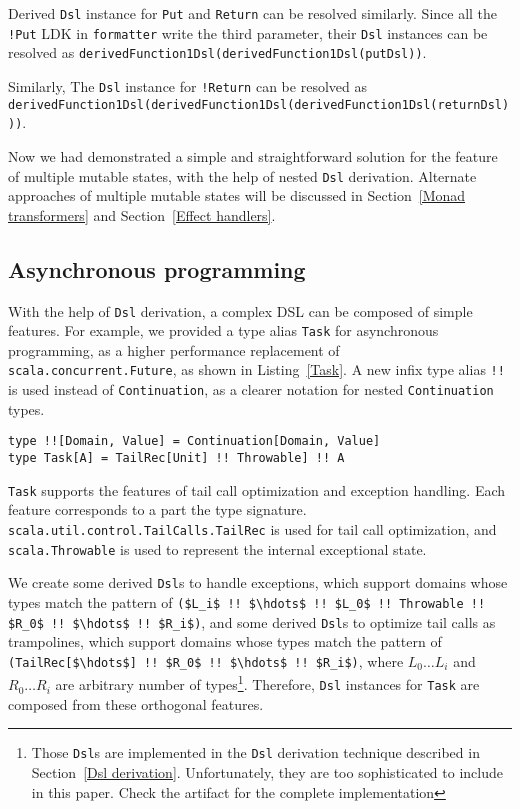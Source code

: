 Derived \lstinline{Dsl} instance for \lstinline{Put} and \lstinline{Return} can be resolved similarly. Since all the \lstinline{!Put} LDK in \lstinline{formatter} write the third parameter, their \lstinline{Dsl} instances can be resolved as \lstinline{derivedFunction1Dsl(derivedFunction1Dsl(putDsl))}.

Similarly, The \lstinline{Dsl} instance for \lstinline{!Return} can be resolved as \lstinline{derivedFunction1Dsl(derivedFunction1Dsl(derivedFunction1Dsl(returnDsl)))}.

Now we had demonstrated a simple and straightforward solution for the feature of multiple mutable states, with the help of nested \lstinline{Dsl} derivation. Alternate approaches of multiple mutable states will be discussed in Section~\ref{Monad transformers} and Section~\ref{Effect handlers}.


\subsection{Asynchronous programming}\label{Asynchronous programming}

With the help of \lstinline{Dsl} derivation, a complex DSL can be composed of simple features. For example, we provided a type alias \lstinline{Task} for asynchronous programming, as a higher performance replacement of \lstinline{scala.concurrent.Future}, as shown in Listing~\ref{Task}. A new infix type alias \lstinline{!!} is used instead of \lstinline{Continuation}, as a clearer notation for nested \lstinline{Continuation} types.
\begin{lstlisting}[caption={The definition of asynchronous \lstinline{Task}},label={Task}]
type !![Domain, Value] = Continuation[Domain, Value]
type Task[A] = TailRec[Unit] !! Throwable] !! A
\end{lstlisting}

\lstinline{Task} supports the features of tail call optimization and exception handling. Each feature corresponds to a part the type signature. \lstinline{scala.util.control.TailCalls.TailRec} is used for tail call optimization, and \lstinline{scala.Throwable} is used to represent the internal exceptional state.

We create some derived \lstinline{Dsl}s to handle exceptions, which support domains whose types match the pattern of \lstinline[mathescape=true]{($L_i$ !! $\hdots$ !! $L_0$ !! Throwable !! $R_0$ !! $\hdots$ !! $R_i$)}, and some derived \lstinline{Dsl}s to optimize tail calls as trampolines, which support domains whose types match the pattern of \lstinline[mathescape=true]{(TailRec[$\hdots$] !! $R_0$ !! $\hdots$ !! $R_i$)}, where $L_0 \hdots L_i$ and $R_0 \hdots R_i$ are arbitrary number of types\footnote{Those \lstinline{Dsl}s are implemented in the \lstinline{Dsl} derivation technique described in Section~\ref{Dsl derivation}. Unfortunately, they are too sophisticated to include in this paper. Check the artifact for the complete implementation}. Therefore, \lstinline{Dsl} instances for \lstinline{Task} are composed from these orthogonal features.

